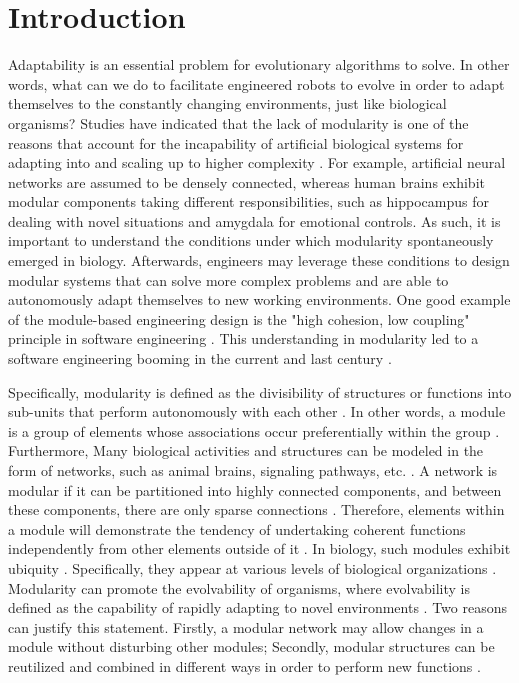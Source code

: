 \section{Introduction}
Adaptability is an essential problem for evolutionary algorithms to solve. In other words, what can we do to facilitate engineered robots to evolve in order to adapt themselves to the constantly changing environments, just like biological organisms? Studies have indicated that the lack of modularity is one of the reasons that account for the incapability of artificial biological systems for adapting into and scaling up to higher complexity \cite{kashtan2005spontaneous}. For example, artificial neural networks are assumed to be densely connected, whereas human brains exhibit modular components taking different responsibilities, such as hippocampus for dealing with novel situations and amygdala for emotional controls. As such, it is important to understand the conditions under which modularity spontaneously emerged in biology. Afterwards, engineers may leverage these conditions to design modular systems that can solve more complex problems and are able to autonomously adapt themselves to new working environments. One good example of the module-based engineering design is the "high cohesion, low coupling" principle in software engineering \cite{hitz1995measuring}. This understanding in modularity led to a software engineering booming in the current and last century \cite{hitz1995measuring}. 

Specifically, modularity is defined as the divisibility of structures or functions into sub-units that perform autonomously with each other \cite{schlosser2004modularity}. In other words, a module is a group of elements whose associations occur preferentially within the group \cite{espinosa2010specialization}. Furthermore, Many biological activities and structures can be modeled in the form of networks, such as animal brains, signaling pathways, etc. \cite{clune2013evolutionary}. A network is modular if it can be partitioned into highly connected components, and between these components, there are only sparse connections \cite{clune2013evolutionary}. Therefore, elements within a module will demonstrate the tendency of undertaking coherent functions independently from other elements outside of it \cite{espinosa2010specialization} \cite{larson2016recombination}. In biology, such modules exhibit ubiquity \cite{schlosser2004modularity}. Specifically, they appear at various levels of biological organizations \cite{espinosa2010specialization}. Modularity can promote the evolvability of organisms, where evolvability is defined as the capability of rapidly adapting to novel environments \cite{pigliucci2008evolvability}. Two reasons can justify this statement. Firstly, a modular network may allow changes in a module without disturbing other modules; Secondly, modular structures can be reutilized and combined in different ways in order to perform new functions \cite{espinosa2010specialization}. 

